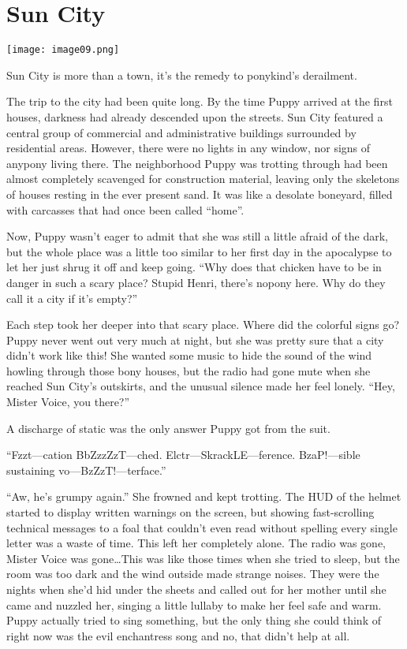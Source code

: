
\chapter{Sun City}

\texttt{[image: image09.png]}

\begin{intro}
Sun City is more than a town, it's the remedy to ponykind's derailment.
\end{intro}



The trip to the city had been quite long. By the time Puppy arrived at the first houses, darkness had already descended upon the streets. Sun City featured a central group of commercial and administrative buildings surrounded by residential areas. However, there were no lights in any window, nor signs of anypony living there. The neighborhood Puppy was trotting through had been almost completely scavenged for construction material, leaving only the skeletons of houses resting in the ever present sand. It was like a desolate boneyard, filled with carcasses that had once been called ``home''.

Now, Puppy wasn't eager to admit that she was still a little afraid of the dark, but the whole place was a little too similar to her first day in the apocalypse to let her just shrug it off and keep going. ``Why does that chicken have to be in danger in such a scary place? Stupid Henri, there's nopony here. Why do they call it a city if it's empty?''

Each step took her deeper into that scary place. Where did the colorful signs go? Puppy never went out very much at night, but she was pretty sure that a city didn't work like this! She wanted some music to hide the sound of the wind howling through those bony houses, but the radio had gone mute when she reached Sun City's outskirts, and the unusual silence made her feel lonely. ``Hey, Mister Voice, you there?''

A discharge of static was the only answer Puppy got from the suit.

{\mt ``Fzzt---cation BbZzzZzT---ched. Elctr---SkrackLE---ference. BzaP!---sible sustaining vo---BzZzT!---terface.''}

``Aw, he's grumpy again.'' She frowned and kept trotting. The HUD of the helmet started to display written warnings on the screen, but showing fast-scrolling technical messages to a foal that couldn't even read without spelling every single letter was a waste of time. This left her completely alone. The radio was gone, Mister Voice was gone\dots This was like those times when she tried to sleep, but the room was too dark and the wind outside made strange noises. They were the nights when she'd hid under the sheets and called out for her mother until she came and nuzzled her, singing a little lullaby to make her feel safe and warm. Puppy actually tried to sing something, but the only thing she could think of right now was the evil enchantress song and no, that didn't help at all.

